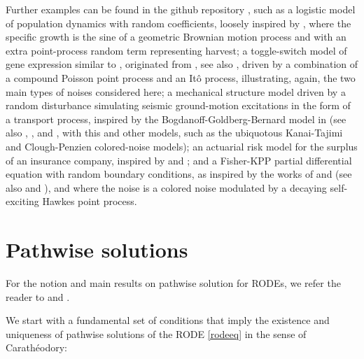 \documentclass[reqno,12pt]{amsart}
\theoremstyle{plain} %
\theoremstyle{definition} %
\begin{document}
Further examples can be found in the github repository \cite{RODEConvEM2023}, such as a logistic model of population dynamics with random coefficients, loosely inspired by \cite[Section 15.2]{HanKloeden2017}, where the specific growth is the sine of a geometric Brownian motion process and with an extra point-process random term representing harvest; a toggle-switch model of gene expression similar to \cite[Section 7.8]{Asai2016}, originated from \cite{VerdCrombachJaeger2014}, see also \cite{StrasserTheisMarr2012}, driven by a combination of a compound Poisson point process and an It\^o process, illustrating, again, the two main types of noises considered here; a mechanical structure model driven by a random disturbance simulating seismic ground-motion excitations in the form of a transport process, inspired by the Bogdanoff-Goldberg-Bernard model in \cite{BogdanoffGoldbergBernard1961} (see also \cite[Chapter 18]{NeckelRupp2013}, \cite{HousnerJenning1964}, and \cite{Kanai1957}, with this and other models, such as the ubiquotous Kanai-Tajimi and Clough-Penzien colored-noise models); an actuarial risk model for the surplus of an insurance company, inspired by \cite{GerberShiu1998} and \cite{BrigoMercurio2006}; and a Fisher-KPP partial differential equation with random boundary conditions, as inspired by the works of \cite{SalakoShen2020} and \cite{FreidlinWentzell1992} (see also \cite{Fisher1937} and \cite{KPP1937}), and where the noise is a colored noise modulated by a decaying self-exciting Hawkes point process.

\section{Pathwise solutions}
\label{secpathwisesolution}

For the notion and main results on pathwise solution for RODEs, we refer the reader to \cite[Section 2.1]{HanKloeden2017} and \cite[Section 3.3]{NeckelRupp2013}.

We start with a fundamental set of conditions that imply the existence and uniqueness of pathwise solutions of the RODE \eqref{rodeeq} in the sense of Carath\'eodory:
\end{document}
